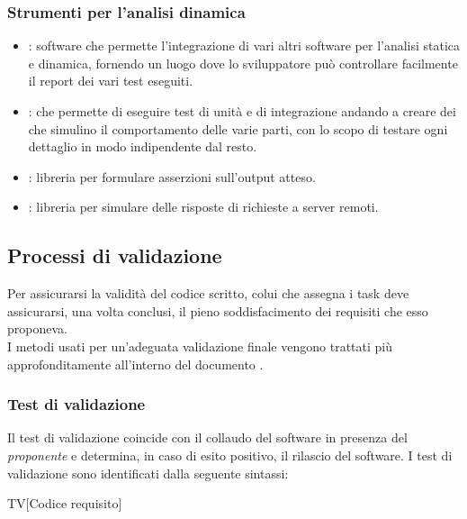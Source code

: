 \subsubsection{Strumenti per l'analisi dinamica}
\begin{itemize}
  \item \textbf{}: software che permette l'integrazione di vari altri software per l'analisi statica e dinamica, fornendo un luogo dove lo sviluppatore può controllare facilmente il report dei vari test eseguiti.
  \item \textbf{}:  che permette di eseguire test di unità e di integrazione andando a creare dei  che simulino il comportamento delle varie parti, con lo scopo di testare ogni dettaglio in modo indipendente dal resto.
  \item \textbf{}: libreria per formulare asserzioni sull'output atteso.
  \item \textbf{}: libreria per simulare delle risposte di richieste a server remoti.

\end{itemize}

\subsection{Processi di validazione}
Per assicurarsi la validità del codice scritto, colui che assegna i task deve assicurarsi, una volta conclusi, il pieno soddisfacimento dei requisiti che esso proponeva. \\
I metodi usati per un'adeguata validazione finale vengono trattati più approfonditamente all'interno del documento \pianoDiQualifica.

\subsubsection{Test di validazione}
Il test di validazione coincide con il collaudo del software in presenza del \textit{proponente} e determina, in caso di esito positivo, il rilascio del software. I test di validazione sono identificati dalla seguente sintassi:
\begin{center}
  TV[Codice requisito]
\end{center}

